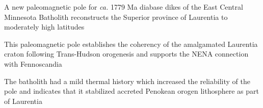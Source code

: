 \documentclass[draft]{agujournal2019}
\begin{document}







\begin{keypoints}
\item A new paleomagnetic pole for \textit{ca.} 1779 Ma diabase dikes of the East Central Minnesota Batholith reconstructs the Superior province of Laurentia to moderately high latitudes
\item This paleomagnetic pole establishes the coherency of the amalgamated Laurentia craton following Trans-Hudson orogenesis and supports the NENA connection with Fennoscandia
\item The batholith had a mild thermal history which increased the reliability of the pole and indicates that it stabilized accreted Penokean orogen lithosphere as part of Laurentia
\end{keypoints}

%
%
\end{document}
